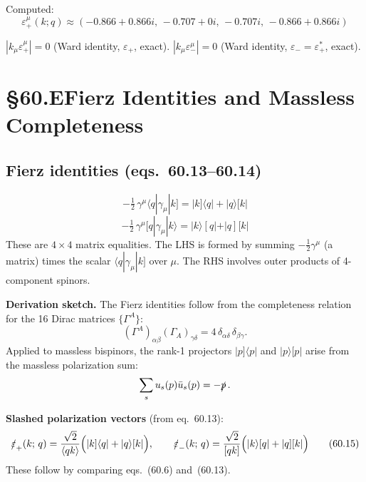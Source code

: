 \documentclass[12pt]{article}
\newcommand{\verified}[1]{\textcolor{verifygreen}{\checkmark\; #1}}
\begin{document}
Computed:
\[
  \varepsilon_+^\mu(k;q) \approx (-0.866+0.866i,\,-0.707+0i,\,-0.707i,\,-0.866+0.866i)
\]

\verified{$|k_\mu\varepsilon_+^\mu| = 0$ (Ward identity, $\varepsilon_+$, exact).}
\verified{$|k_\mu\varepsilon_-^\mu| = 0$ (Ward identity, $\varepsilon_- = \varepsilon_+^*$, exact).}

\section{§60.E\quad Fierz Identities and Massless Completeness}

\subsection{Fierz identities (eqs.~60.13--60.14)}

\begin{equation}
  \boxed{
    -\tfrac12\,\gamma^\mu\langle q|\gamma_\mu|k]
    = |k]\langle q| + |q\rangle[k|
  }
  \tag{60.13}
\end{equation}
\begin{equation}
  -\tfrac12\,\gamma^\mu[q|\gamma_\mu|k\rangle
  = |k\rangle[q| + |q][k|
  \tag{60.14}
\end{equation}
These are $4\times4$ matrix equalities.  The LHS is formed by summing
$-\tfrac12\gamma^\mu$ (a matrix) times the scalar $\langle q|\gamma_\mu|k]$
over $\mu$.  The RHS involves outer products of 4-component spinors.

\textbf{Derivation sketch.}
The Fierz identities follow from the completeness relation for the 16 Dirac
matrices $\{\Gamma^A\}$:
\[
  (\Gamma^A)_{\alpha\beta}(\Gamma_A)_{\gamma\delta} = 4\,\delta_{\alpha\delta}\,\delta_{\beta\gamma}.
\]
Applied to massless bispinors, the rank-1 projectors $|p]\langle p|$ and
$|p\rangle[p|$ arise from the massless polarization sum:
\[
  \sum_s u_s(p)\bar u_s(p) = -\slashed p\,.
\]

\textbf{Slashed polarization vectors} (from eq.~60.13):
\begin{equation}
  \slashed\varepsilon_+(k;\,q) = \frac{\sqrt{2}}{\langle qk\rangle}\Bigl(|k]\langle q| + |q\rangle[k|\Bigr),
  \qquad
  \slashed\varepsilon_-(k;\,q) = \frac{\sqrt{2}}{[qk]}\Bigl(|k\rangle[q| + |q][k|\Bigr)
  \tag{60.15}
\end{equation}
These follow by comparing eqs.~(60.6) and~(60.13).
\end{document}
